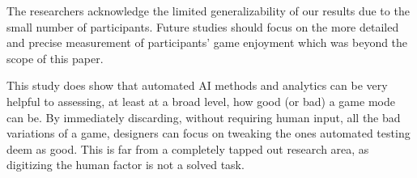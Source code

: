 The researchers acknowledge the limited generalizability of our results due to the small number of participants. Future studies should focus on the more detailed and precise measurement of participants’ game enjoyment which was beyond the scope of this paper.

This study does show that automated AI methods and analytics can be very helpful to assessing, at least at a broad level, how good (or bad) a game mode can be. By immediately discarding, without requiring human input, all the bad variations of a game, designers can focus on tweaking the ones automated testing deem as good. This is far from a completely tapped out research area, as digitizing the human factor is not a solved task.